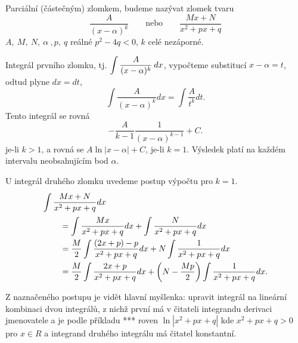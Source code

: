       \begin{definition} Parciální (částečným) zlomkem, budeme nazývat zlomek tvaru
         \begin{equation}
            \frac{A}{(x-\alpha)^k} \qquad\text{nebo}\qquad\frac{Mx + N}{x^2 + px +q}
         \end{equation}  
         $A,\ M,\ N,\ \alpha\ , p,\ q$ reálné $p^2-4q < 0$, $k$ celé nezáporné.         
      \end{definition}
      
      Integrál prvního zlomku, tj. $\displaystyle{\int\frac{A}{(x-\alpha)^k}\hspace{2pt}dx}$, vypočteme substitucí 
      $x-\alpha=t$, odtud plyne $dx = dt$,
      \begin{equation}\label{MA:int_ex_14}
        \int\frac{A}{(x-\alpha)^k}dx = \int\frac{A}{t^k}dt.
      \end{equation}
      Tento integrál se rovná
      \begin{equation}\label{MA:int_ex_16}
        -\frac{A}{k-1}\frac{1}{(x-\alpha)^{k-1}} + C.
      \end{equation}        
      je-li $k>1$, a rovná se $A\ln|x-\alpha| + C$, je-li $k = 1$. Výsledek platí na každém
      intervalu neobsahujícím bod $\alpha$.
      
       U integrál druhého zlomku uvedeme postup výpočtu pro $k = 1$. 
      \begin{align*}
         \intertext{\(\displaystyle\int{\frac{Mx + N}{x^2+px+q}dx}\)}
           \qquad &=  \int{\frac{Mx}{x^2+px+q}dx} + \int{\frac{N}{x^2+px+q}dx}                     \\  
           \qquad &=  \frac{M}{2}\int{\frac{(2x + p) - p}{x^2+px+q}dx} + 
                     N\int{\frac{1}{x^2+px+q}dx}                                                   \\ 
           \qquad &=  \frac{M}{2}\int{\frac{2x + p}{x^2+px+q}dx} + 
                      \left(N-\frac{Mp}{2}\right)\int{\frac{1}{x^2+px+q}dx.}                   
      \end{align*}  
      
      Z naznačeného postupu je vidět hlavní myšlenka: upravit integrál na lineární kombinaci dvou integrálů, 
      z nichž první má v čitateli integrandu derivaci jmenovatele a je podle příkladu *** roven 
      $\ln|x^2+px+q|$ kde $x^2+px+q >0$ pro $x\in R$ a integrand druhého integrálu má čitatel konstantní.
      
